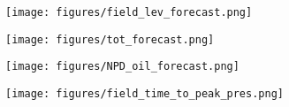 \documentclass{beamer}
\begin{document}
\begin{frame}[plain]
	\begin{figure}
		\texttt{[image: figures/field\_lev\_forecast.png]}
		\caption*{}
		\label{field_lev_forecast}
	\end{figure}

\end{frame}


\begin{frame}[plain]
	\begin{figure}
		\texttt{[image: figures/tot\_forecast.png]}
		\caption*{}
		\label{tot_forecast}
	\end{figure}

\end{frame}

\begin{frame}[plain]
\begin{figure}
		\texttt{[image: figures/NPD\_oil\_forecast.png]}
		\caption*{}
		\label{NPD_oil_forecast}
	\end{figure}
\end{frame}


\begin{frame}[plain]
\begin{figure}
		\texttt{[image: figures/field\_time\_to\_peak\_pres.png]}
		\caption*{}
		\label{field_time_to_peak}
	\end{figure}
\end{frame}
\end{document}
